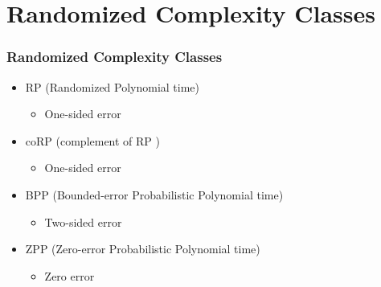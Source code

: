 \documentclass{beamer}
\begin{document}
\section{Randomized Complexity Classes}
\begin{frame}
\frametitle{Randomized Complexity Classes}
\begin{itemize}
	\item {\color{red} RP} (Randomized Polynomial time)
	\begin{itemize}
		\item One-sided error

	\end{itemize}
	\item {\color{red} coRP} (complement of RP )
	\begin{itemize}
		\item One-sided error
	\end{itemize}
	\item {\color{red} BPP} (Bounded-error Probabilistic Polynomial time)
	\begin{itemize}
		\item Two-sided error
	\end{itemize}
	\item {\color{red} ZPP} (Zero-error Probabilistic Polynomial time)
	\begin{itemize}
		\item Zero error
	\end{itemize}
\end{itemize}
\end{frame}
\end{document}
